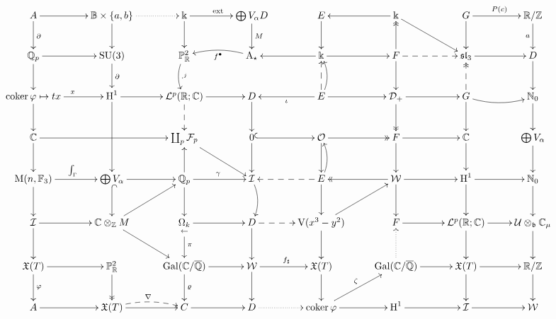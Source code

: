 \documentclass[landscape]{article}
\newcommand{\ox}{\otimes}
\newcommand{\OA}{\operatorname{A_\star}}
\newcommand{\OB}{\mathbb B \times \{ a,b \}}
\newcommand{\OC}{\mathbb C}
\newcommand{\OD}{\mathcal D_+}
\renewcommand{\OE}{{\coprod_{p}\mathcal F_p}}
\newcommand{\OF}{{\operatorname{coker} \varphi}}
\newcommand{\OG}{{\operatorname{Gal}( \mathbb{C} / \overline{ \mathbb Q})}}
\newcommand{\OH}{\operatorname{H}^1}
\newcommand{\OI}{\mathcal I}
\newcommand{\OJ}{{\operatorname{M}(n,\mathbb F_3)}}
\newcommand{\OK}{\Bbbk}
\newcommand{\OL}{\mathcal L^p(\mathbb R;\mathbb C)}
\newcommand{\OLL}{\underset{\leftarrow}{\Omega_k}}
\newcommand{\ON}{{\mathbb N_0} }
\newcommand{\OO}{\mathcal O}
\newcommand{\OOO}{0}
\newcommand{\OP}{{\mathbb P_{\mathbb R}^2}}
\newcommand{\OQ}{{\mathbb Q_p}}
\newcommand{\OR}{{\mathbb R/ \mathbb Z}}
\newcommand{\OS}{\bigoplus V_\alpha}
\newcommand{\OT}{{\mathbb C \ox_\mathbb Z M}}
\newcommand{\OU}{{\operatorname{SU}(3)}}
\newcommand{\OW}{\mathcal W}
\newcommand{\OV}{\mathcal U \ox_{\mathfrak b} \mathbb C_\mu}
\newcommand{\OX}{\mathfrak X(T)}
\newcommand{\OY}{{\mathfrak{sl}_3}}
\newcommand{\OZ}{{\operatorname V(x^3-y^2)}}
\newcommand{\MA}{x \mapsto tx}
\newcommand{\MC}{{\partial}}
\newcommand{\MD}{\iota}
\newcommand{\ME}{{\operatorname{ext}}}
\newcommand{\MF}{{f^\bullet}}
\newcommand{\MI}{{\int_\Gamma}}
\newcommand{\MJ}{{\cdot^j}}
\newcommand{\MN}{{\nabla}}
\newcommand{\MZ}{\zeta}
\begin{document}
$\xymatrix{
A  \ar[r] \ar[d]^\MC      &\OB \ar@{.>}[r] \ar[d]          &\OK \ar[r]^\ME \ar[d]      &\OS       \ar[d]^MD                   &  E \ar@{<-}[r] \ar[d]    &\OK\ar[rd]\ar@{<<-}[d]           & G \ar[r]^{P(c)}\ar[d]  &\OR \ar[d]_a \\
\OQ\ar[r] \ar[d]          &\OU        \ar[d]^\MC           &\OP \ar@/_/[d]^\MJ	      &\OA\ar@{<-}[r] \ar@/_/[l]^\MF         &\OK \ar[r] \ar@{<--}[d]   & F \ar@{-->}[r] \ar[d]           &\OY\ar[r] \ar@{<<--}[d] & D  \ar[d]  \\
\OF\ar[r]^\MA \ar[d]      &\OH \ar[r] \ar[dd]              &\OL \ar[r] \ar@{-->}[d]    & D \ar@{<-}[r]_\MD  \ar[d]            &  E \ar[r] \ar@/_/[u]     &\OD\ar[r] \ar@{->>}[d]           & G \ar@/_/[r] \ar[d]    &\ON \ar[d]  \\
\OC\ar[rr] \ar[d]         &                                &\OE \ar[rd] \ar@{<-}[d]    &\OOO\ar@{^{(}->}[r]    \ar[d]          &\OO \ar@{->>}[r] \ar[d]   & F \ar[r] \ar[d]                 &\OC    \ar[d]           &\OS \ar[d]  \\
\OJ\ar[r]^\MI \ar[d]      &\OS \ar[r] \ar@{^{(}->}[d]      &\OQ \ar[r]^\gamma \ar[d]   &\OI\ar@{<--}[r]    \ar@/^/[d]         &  E \ar[d] \ar@/_/[u]     &\OW\ar[r] \ar@{->>}[l] \ar[d]    &\OH\ar[r] \ar[d]        &\ON \ar[d]  \\
\OI\ar[r] \ar[d]          &\OT \ar[ru]        \ar[rd]      &\OLL\ar[r] \ar[d]^\pi      & D \ar@{-->}[r] \ar[d]                &\OZ\ar[ru]\ar[d]          & F \ar[r] \ar@{<.}[d]            &\OL\ar[r] \ar[d]        &\OV \ar[d]  \\
\OX\ar[r] \ar[d]^\varphi  &\OP        \ar@{->>}[d]         &\OG \ar[r] \ar[d]^\varrho  &\OW\ar[r]^{f_\sharp} \ar[d]           &\OX  \ar[d]               &\OG\ar[r]                        &\OX\ar[r] \ar[d]        &\OR \ar[d]  \\
A  \ar[r]                 &\OX \ar[r] \ar@/^/@{-->}[r]^\MN & C  \ar[r]                 & D \ar@{.>}[r]                        &\OF \ar[r] \ar[ru]^\MZ    &\OH\ar[r]                        &\OI\ar[r]               &\OW   \\
}$
\end{document}
